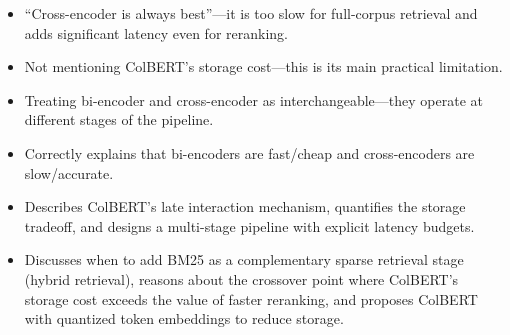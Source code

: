 \begin{interviewq}
\redflags
\begin{itemize}
    \item ``Cross-encoder is always best''---it is too slow for full-corpus retrieval and adds significant latency even for reranking.
    \item Not mentioning ColBERT's storage cost---this is its main practical limitation.
    \item Treating bi-encoder and cross-encoder as interchangeable---they operate at different stages of the pipeline.
\end{itemize}


\goodgreat
\begin{itemize}
    \item {} Correctly explains that bi-encoders are fast/cheap and cross-encoders are slow/accurate.
    \item {} Describes ColBERT's late interaction mechanism, quantifies the storage tradeoff, and designs a multi-stage pipeline with explicit latency budgets.
    \item {} Discusses when to add BM25 as a complementary sparse retrieval stage (hybrid retrieval), reasons about the crossover point where ColBERT's storage cost exceeds the value of faster reranking, and proposes ColBERT with quantized token embeddings to reduce storage.
\end{itemize}

\end{interviewq}

